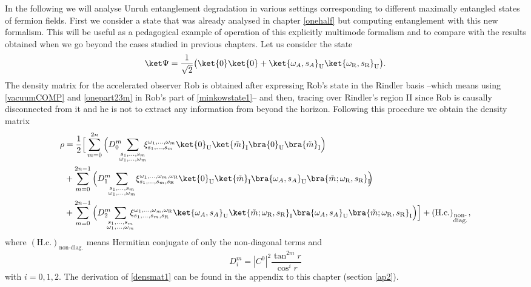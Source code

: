 In the following we will analyse Unruh entanglement degradation in various \mbox{settings} corresponding to different maximally entangled states of fermion fields. First we consider a state that was already analysed in chapter \ref{onehalf} but computing entanglement with this new formalism. This will be useful as a pedagogical example of operation of this explicitly multimode formalism and to compare with the results obtained when we go beyond the cases studied in previous chapters. Let us consider the state 
\begin{equation}\label{minkowstate1}\ket\Psi=\frac{1}{\sqrt2}\big(\ket{0}\ket{0}+\ket{\omega_A,s_A}_\text{U}\ket{\omega_\text{R},s_\text{R}}_\text{U}\big).\end{equation}
The density matrix for the accelerated observer Rob is obtained after expressing Rob's state in the Rindler basis --which means using \eqref{vacuumCOMP} and \eqref{onepart23m} in Rob's part of \eqref{minkowstate1}-- and then, tracing over Rindler's region II since Rob is causally disconnected from it and he is not to extract any information from beyond the horizon. Following this procedure we obtain the density matrix
\begin{align}\label{densmat1}
\nonumber\rho&=\frac{1}{2}\Big[\sum_{m=0}^{2n}\Big(D_{0}^m\!\!\!\sum_{\substack{s_1,\dots,s_m\\\omega_1,\dots,\omega_m}}\!\!\!
\xi_{s_1,\dots,s_m}^{\omega_1,\dots,\omega_m}\ket{0}_{\text{U}}\ket{\tilde m}_\text{I}\bra{0}_{\text{U}}\bra{\tilde m}_\text{I}\Big)\\*
\nonumber&+\sum_{m=0}^{2n-1}\Big(D_{1}^m\!\!\!\sum_{\substack{s_1,\dots,s_m\\\omega_1,\dots,\omega_m}}\!\xi_{s_1,\dots,s_m,s_\text{R}}^{\omega_1,\dots,\omega_m,\omega_\text{R}}
\ket{0}_{\text{U}}\ket{\tilde m}_\text{I}\bra{\omega_A,s_A}_{\text{U}}\bra{\tilde m;\omega_\text{R},s_\text{R}}_\text{I}\!\!\Big)\\*
&+\sum_{m=0}^{2n-1}\Big(D_{2}^m\!\!\!\!\sum_{\substack{s_1,\dots,s_m\\\omega_1,\dots,\omega_m}}\!\!\!\!
\xi_{s_1,\dots,s_m,s_\text{R}}^{\omega_1,\dots,\omega_m,\omega_\text{R}}\ket{\omega_A,s_A}_{\text{U}}\ket{\tilde m;\omega_\text{R},s_\text{R}}_\text{I}\bra{\omega_A,s_A}_{\text{U}}\bra{\tilde m;\omega_\text{R},s_\text{R}}_\text{I}\Big)\Big]+(\text{H.c.})_{_{\substack{\text{non-}\\\text{diag.}}}},
\end{align}
where $(\text{H.c.})_{\text{non-diag.}}$ means Hermitian conjugate of only the non-diagonal terms and
\begin{equation}\label{Des}
D_i^m=|C^0|^2\frac{\tan^{2m}r}{\cos^i r}
\end{equation}
with $i=0,1,2$. The derivation of \eqref{densmat1} can be found in the appendix to this chapter (section \ref{ap2}). 

